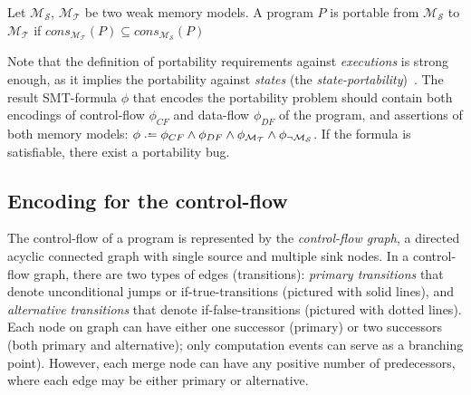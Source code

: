 \begin{definition}[Portability]
Let $\mathcal{M_S}$, $\mathcal{M_T}$ be two weak memory models. A program $P$ is portable from $\mathcal{M_S}$ to $\mathcal{M_T}$ if 
$cons_{\mathcal{M_T}}(P) \subseteq cons_{\mathcal{M_S}}(P)$
\end{definition}

Note that the definition of portability requirements against \textit{executions} is strong enough, as it implies the portability against \textit{states} (the \textit{state-portability})~\cite{Porthos17b}.
The result SMT-formula $\phi$ that encodes the portability problem should contain both encodings of control-flow $\phi_{CF}$ and data-flow $\phi_{DF}$ of the program, and assertions of both memory models: ${\phi \defeq \phi_{CF} \land \phi_{DF} \land \phi_{\mathcal{M_T}} \land \phi_{\lnot\mathcal{M_S}}}$. If the formula is satisfiable, there exist a portability bug.


\subsection{Encoding for the control-flow} %
\label{ch:port:enc:cf}

The control-flow of a program is represented by the \textit{control-flow graph}, a directed acyclic connected graph with single source and multiple sink nodes. %
In a control-flow graph, there are two types of edges (transitions): \textit{primary transitions} that denote unconditional jumps or if-true-transitions (pictured with solid lines), and \textit{alternative transitions} that denote if-false-transitions (pictured with dotted lines).
Each node on graph can have either one successor (primary) or two successors (both primary and alternative); only computation events can serve as a branching point).
However, each merge node can have any positive number of predecessors, where each edge may be either primary or alternative.

